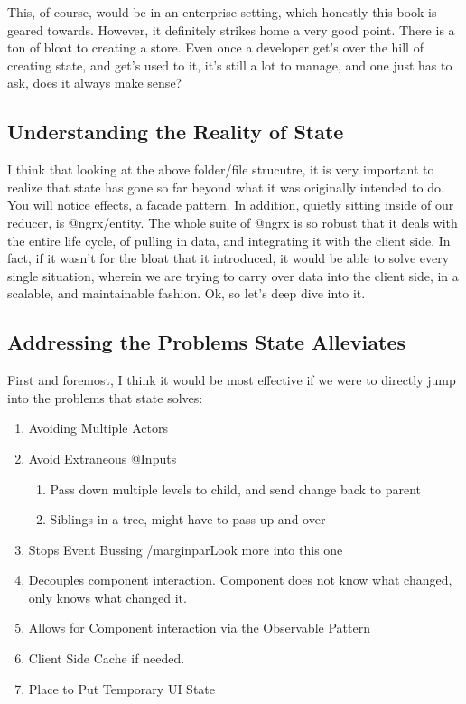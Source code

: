 This, of course, would be in an enterprise setting, which honestly this book
is geared towards. However, it definitely strikes home a very good point. There
is a ton of bloat to creating a store. Even once a developer get's over the hill
of creating state, and get's used to it, it's still a lot to manage, and one
just has to ask, does it always make sense?

\subsection{Understanding the Reality of State}
I think that looking at the above folder/file strucutre, it is very important
to realize that state has gone so far beyond what it was originally intended to
do. You will notice effects, a facade pattern. In addition, quietly sitting
inside of our reducer, is @ngrx/entity. The whole suite of @ngrx is so robust
that it deals with the entire life cycle, of pulling in data, and integrating it
with the client side. In fact, if it wasn't for the bloat that it introduced,
it would be able to solve every single situation, wherein we are trying to carry
over data into the client side, in a scalable, and maintainable fashion. Ok, so
let's deep dive into it.

\subsection{ Addressing the Problems State Alleviates }
First and foremost, I think it would be most effective if we were to directly
jump into the problems that state solves:
\begin{enumerate}
  \item Avoiding Multiple Actors
  \item Avoid Extraneous @Inputs
  \begin{enumerate}
    \item Pass down multiple levels to child, and send change back to parent
    \item Siblings in a tree, might have to pass up and over
  \end{enumerate}
  \item Stops Event Bussing /marginpar{Look more into this one}
  \item Decouples component interaction. Component does not know what changed,
  only knows what changed it.
  \item Allows for Component interaction via the Observable Pattern
  \item Client Side Cache if needed.
  \item Place to Put Temporary UI State
\end{enumerate}

